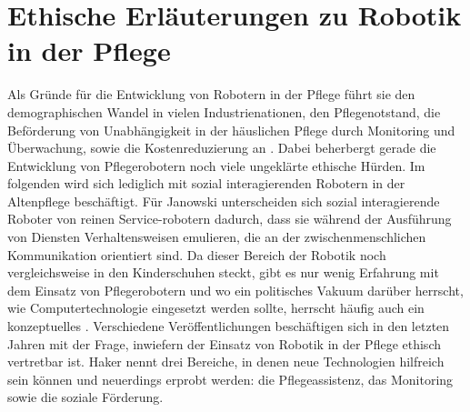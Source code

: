 \chapter{Ethische Erläuterungen zu Robotik in der Pflege}
\label{ch:2}
 Als Gründe für die Entwicklung von Robotern in der Pflege führt sie den demographischen Wandel in vielen Industrienationen, den Pflegenotstand, die Beförderung von Unabhängigkeit in der häuslichen Pflege durch Monitoring und Überwachung, sowie die Kostenreduzierung an \cite[56]{haker}.  Dabei beherbergt gerade die Entwicklung von Pflegerobotern noch viele ungeklärte ethische Hürden. Im folgenden wird sich lediglich mit sozial interagierenden Robotern in der Altenpflege  beschäftigt. Für Janowski unterscheiden sich sozial  interagierende  Roboter  von  reinen  Service-robotern  dadurch,  dass  sie  während  der  Ausführung  von  Diensten  Verhaltensweisen  emulieren,  die  an  der zwischenmenschlichen  Kommunikation  orientiert  sind. \cite[65]{vier}
Da dieser Bereich der Robotik noch vergleichsweise in den Kinderschuhen steckt, gibt es nur wenig Erfahrung mit dem Einsatz von Pflegerobotern und wo ein politisches Vakuum darüber herrscht, wie Computertechnologie eingesetzt werden sollte, herrscht häufig auch ein konzeptuelles \cite[1]{comEthics}.  Verschiedene Veröffentlichungen beschäftigen sich in den letzten Jahren mit der Frage, inwiefern der Einsatz von Robotik in der Pflege ethisch vertretbar ist. Haker \cite[56]{haker} nennt drei Bereiche, in denen neue Technologien hilfreich sein können und neuerdings erprobt werden: die Pflegeassistenz, das Monitoring sowie die soziale Förderung.



